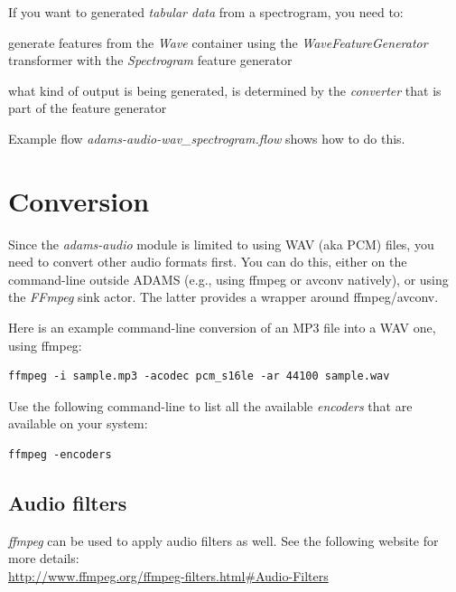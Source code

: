 \documentclass[a4paper]{book}
\begin{document}
\clearpage
\noindent If you want to generated \textit{tabular data} from a spectrogram,
you need to:
\begin{tight_itemize}
  \item generate features from the \textit{Wave} container using the
  \textit{WaveFeatureGenerator} transformer with the \textit{Spectrogram}
  feature generator
  \item what kind of output is being generated, is determined by the
  \textit{converter} that is part of the feature generator
\end{tight_itemize}
Example flow \textit{adams-audio-wav\_spectrogram.flow} shows how to do this.

\chapter{Conversion}
Since the \textit{adams-audio} module is limited to using WAV (aka PCM) files,
you need to convert other audio formats first. You can do this, either on
the command-line outside ADAMS (e.g., using ffmpeg or avconv natively), or
using the \textit{FFmpeg} sink actor. The latter provides a wrapper around
ffmpeg/avconv.

Here is an example command-line conversion of an MP3 file into a WAV one, using
ffmpeg:
\begin{verbatim}
ffmpeg -i sample.mp3 -acodec pcm_s16le -ar 44100 sample.wav
\end{verbatim}

Use the following command-line to list all the available \textit{encoders}
that are available on your system:
\begin{verbatim}
ffmpeg -encoders
\end{verbatim}

\section{Audio filters}
\textit{ffmpeg} can be used to apply audio filters as well. See the following
website for more details: \\

\url{http://www.ffmpeg.org/ffmpeg-filters.html#Audio-Filters}{}


\end{document}
